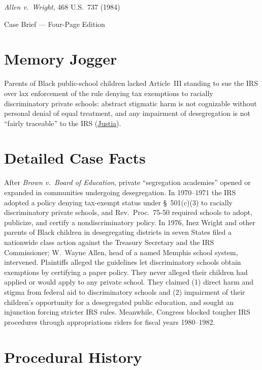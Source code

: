 \documentclass[12pt]{article}
\begin{document}
\begin{center}
{\LARGE \textit{Allen v.\ Wright}, 468 U.S.\ 737 (1984)\par}
\vspace{0.8em}
{\large Case Brief --- Four-Page Edition\par}
\end{center}
\vspace{1em}

\section{Memory Jogger}

Parents of Black public-school children lacked Article~III standing to sue the IRS over lax enforcement of the rule denying tax exemptions to racially discriminatory private schools: abstract stigmatic harm is not cognizable without personal denial of equal treatment, and any impairment of desegregation is not ``fairly traceable'' to the IRS (\href{https://supreme.justia.com/cases/federal/us/468/737/}{Justia}).

\section{Detailed Case Facts}

After \textit{Brown v.\ Board of Education}, private ``segregation academies'' opened or expanded in communities undergoing desegregation. In 1970--1971 the IRS adopted a policy denying tax-exempt status under \S~501(c)(3) to racially discriminatory private schools, and Rev.\ Proc.\ 75-50 required schools to adopt, publicize, and certify a nondiscriminatory policy. In 1976, Inez Wright and other parents of Black children in desegregating districts in seven States filed a nationwide class action against the Treasury Secretary and the IRS Commissioner; W.\ Wayne Allen, head of a named Memphis school system, intervened. Plaintiffs alleged the guidelines let discriminatory schools obtain exemptions by certifying a paper policy. They never alleged their children had applied or would apply to any private school. They claimed (1) direct harm and stigma from federal aid to discriminatory schools and (2) impairment of their children's opportunity for a desegregated public education, and sought an injunction forcing stricter IRS rules. Meanwhile, Congress blocked tougher IRS procedures through appropriations riders for fiscal years 1980--1982.

\section{Procedural History}
\end{document}

